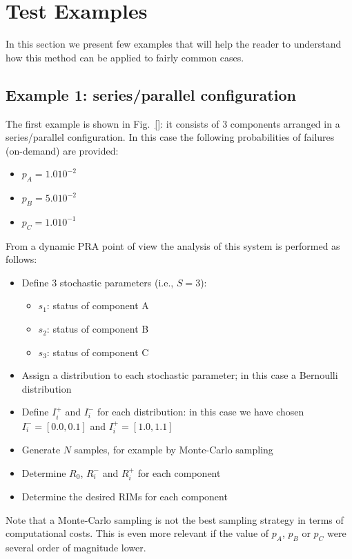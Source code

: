 \section{Test Examples}
\label{sec:test}

In this section we present few examples that will help the reader to understand 
how this method can be applied to fairly common cases.

\subsection{Example 1: series/parallel configuration}
\label{sec:example1}

The first example is shown in Fig.~\ref{}: it consists of 3 components arranged 
in a series/parallel 
configuration. In this case the following probabilities of failures (on-demand) 
are provided:
\begin{itemize}
  \item $p_A = 1.0 10^{-2}$
  \item $p_B = 5.0 10^{-2}$
  \item $p_C = 1.0 10^{-1}$
\end{itemize}
  
From a dynamic PRA point of view the analysis of this system is performed as follows:
\begin{itemize}
  \item Define 3 stochastic parameters (i.e., $S=3$):
    \begin{itemize}
      \item $s_1$: status of component A
      \item $s_2$: status of component B
      \item $s_3$: status of component C
    \end{itemize}
  \item Assign a distribution to each stochastic parameter; in this case a Bernoulli 
        distribution  
  \item Define $I_i^+$ and $I_i^-$ for each distribution: in this case we have chosen 
        $I_i^-=[0.0,0.1]$ and $I_i^+=[1.0,1.1]$ 
  \item Generate $N$ samples, for example by Monte-Carlo sampling 
  \item Determine $R_0$, $R_i^-$ and $R_i^+$ for each component 
  \item Determine the desired RIMs for each component
\end{itemize}

Note that a Monte-Carlo sampling is not the best sampling strategy in terms of computational 
costs. This is even more relevant if the value of $p_A$, $p_B$ or $p_C$ were several order of 
magnitude lower. 

